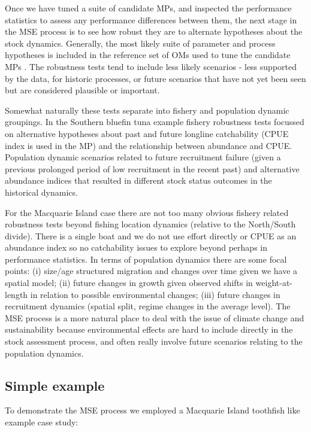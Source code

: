 \documentclass[12pt,a4paper,twoside,times,sky,standard]{csiroreport2017}
\begin{document}
Once we have tuned a suite of candidate MPs, and inspected the performance statistics to assess any performance differences between them, the next stage in the MSE process is to see how robust they are to alternate hypotheses about the stock dynamics. Generally, the most likely suite of parameter and process hypotheses is included in the reference set of OMs used to tune the candidate MPs \cite{mse,sbtmp}. The robustness tests tend to include less likely scenarios - less supported by the data, for historic processes, or future scenarios that have not yet been seen but are considered plausible or important.

Somewhat naturally these tests separate into fishery and population dynamic groupings. In the Southern bluefin tuna example \cite{sbtmp} fishery robustness tests focussed on alternative hypotheses about past and future longline catchability (CPUE index is used in the MP) and the relationship between abundance and CPUE. Population dynamic scenarios related to future recruitment failure (given a previous prolonged period of low recruitment in the recent past) and alternative abundance indices that resulted in different stock status outcomes in the historical dynamics. 

For the Macquarie Island case there are not too many obvious fishery related robustness tests beyond fishing location dynamics (relative to the North/South divide). There is a single boat and we do not use effort directly or CPUE as an abundance index so no catchability issues to explore beyond perhaps in performance statistics. In terms of population dynamics there are some focal points: (i) size/age structured migration and changes over time given we have a spatial model; (ii) future changes in growth given observed shifts in weight-at-length in relation to possible environmental changes; (iii) future changes in recruitment dynamics (spatial split, regime changes in the average level). The MSE process is a more natural place to deal with the issue of climate change and sustainability because environmental effects are hard to include directly in the stock assessment process, and often really involve future scenarios relating to the population dynamics.

\subsection{Simple example}

To demonstrate the MSE process we employed a Macquarie Island toothfish like example case study:
\end{document}
